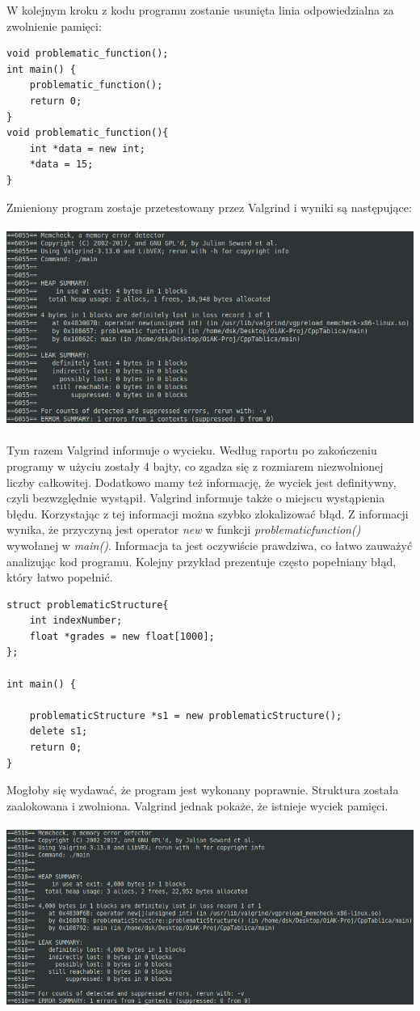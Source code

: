 \documentclass[12pt]{article}
\begin{document}
\newpage
\noindent
W kolejnym kroku z kodu programu zostanie usunięta linia odpowiedzialna za zwolnienie pamięci:
\begin{lstlisting}
void problematic_function();
int main() {
    problematic_function();
    return 0;
}
void problematic_function(){
    int *data = new int;
    *data = 15;
}
\end{lstlisting}
Zmieniony program zostaje przetestowany przez Valgrind i wyniki są następujące: \\\\
\includegraphics[scale=0.5]{cpp1lVal} \\\\
Tym razem Valgrind informuje o wycieku. Według raportu po zakończeniu programy w użyciu zostały 4 bajty, co zgadza się z rozmiarem niezwolnionej liczby całkowitej. Dodatkowo mamy też informację, że wyciek jest definitywny, czyli bezwzględnie wystąpił. Valgrind informuje także o miejscu wystąpienia błędu. Korzystając z tej informacji można szybko zlokalizować błąd. Z informacji wynika, że przyczyną jest operator \textit{new} w funkcji \textit{problematicfunction()} wywołanej w \textit{main()}. Informacja ta jest oczywiście prawdziwa, co łatwo zauważyć analizując kod programu.
\newpage
\noindent
Kolejny przykład prezentuje często popełniany błąd, który łatwo popełnić. 
\begin{lstlisting}
struct problematicStructure{
    int indexNumber;
    float *grades = new float[1000];
};

int main() {

    problematicStructure *s1 = new problematicStructure();
    delete s1;
    return 0;
}
\end{lstlisting}
Mogłoby się wydawać, że program jest wykonany poprawnie. Struktura została zaalokowana i zwolniona. Valgrind jednak pokaże, że istnieje wyciek pamięci.\\\\
\includegraphics[scale=0.5]{cpp2lVal} \\\\
\end{document}

